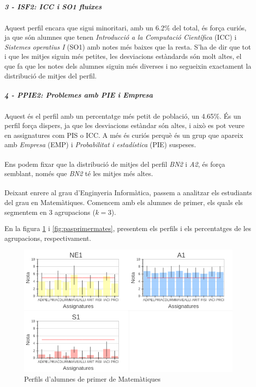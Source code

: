 \documentclass[12pt,a4paper,catalan]{article}
\begin{document}
\subparagraph{3 - ISF2: ICC i SO1 fluixes}
Aquest perfil encara que sigui minoritari, amb un 6.2\% del total, és força curiós, ja que són alumnes que tenen \textit{Introducció a la Computació Científica} (ICC) i \textit{Sistemes operatius I} (SO1) amb notes més baixes que la resta. S'ha de dir que tot i que les mitjes siguin més petites, les desviacions estàndards són molt altes, el que fa que les notes dels alumnes siguin més diverses i no segueixin exactament la distribució de mitjes del perfil.

\subparagraph{4 - PPIE2: Problemes amb PIE i Empresa}
Aquest és el perfil amb un percentatge més petit de població, un 4.65\%. És un perfil força dispers, ja que les desviacions estàndar són altes, i això es pot veure en assignatures com PIS o ICC. A més és curiós perquè és un grup que apareix amb \textit{Empresa} (EMP) i \textit{Probabilitat i estadística} (PIE) suspeses.
\\
\\
Ens podem fixar que la distribució de mitjes del perfil \textit{BN2} i \textit{A2}, és força semblant, només que \textit{BN2} té les mitjes més altes.
\\
\\
Deixant enrere al grau d'Enginyeria Informàtica, passem a analitzar els estudiants del grau en Matemàtiques. Comencem amb els alumnes de primer, els quals els segmentem en 3 agrupacions ($k=3$).

\newpage

En la figura \ref{fig:perfilsprimermates} i \ref{fig:pasprimermates}, presentem els perfils i els percentatges de les agrupacions, respectivament.

\begin{figure}[h]
\centering
\includegraphics[width=.9\linewidth]{img/perfils_primer_mates.png}
\caption{Perfils d'alumnes de primer de Matemàtiques}
\label{fig:perfilsprimermates}
\end{figure}
\end{document}

